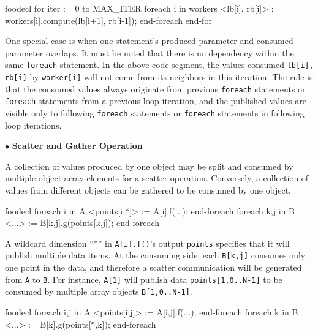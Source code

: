 \documentclass[10pt]{article}
\def\smallfbox#1{{\small {\fbox{#1}}}}
\def\code#1{{\small {\tt {#1}}}}
\begin{document}
\begin{SaveVerbatim}{foodecl}
  for iter := 0 to MAX_ITER
    foreach i in workers
      <lb[i], rb[i]> := workers[i].compute(lb[i+1], rb[i-1]);
    end-foreach
  end-for
\end{SaveVerbatim}
\vspace{0.1in}
\smallfbox{\BUseVerbatim{foodecl}}
\vspace{0.1in}

One special case is when one statement's produced parameter and consumed
parameter overlaps. It must be noted that there is no dependency within the same
\code{foreach} statement. In the above code segment, the values consumed
\code{lb[i], rb[i]} by \code{worker[i]} will not come from  
its neighbors in this iteration. The rule is that the consumed values always
originate from previous \code{foreach} statements or \code{foreach} statements
from a previous loop iteration, and the published values are visible only to
following \code{foreach} statements or \code{foreach} statements in following
loop iterations. 

$\bullet$ {\bf Scatter and Gather Operation}

A collection of values produced by one object may be split and consumed by
multiple object array elements for a scatter operation. Conversely, a collection
of values from different objects can be gathered to be consumed by one object.

\begin{SaveVerbatim}{foodecl}
  foreach i in A
    <points[i,*]> := A[i].f(...);
  end-foreach
  foreach k,j in B
    <...> := B[k,j].g(points[k,j]);
  end-foreach
\end{SaveVerbatim}
\vspace{0.1in}
\smallfbox{\BUseVerbatim{foodecl}}
\vspace{0.1in}

A wildcard dimension ``*'' in \code{A[i].f()}'s output \code{points} specifies
that it will publish multiple data items. At the consuming side, each
\code{B[k,j]} consumes only one point in the data, and therefore a scatter
communication will be generated from \code{A} to \code{B}. For instance,
\code{A[1]} will publish data \code{points[1,0..N-1]} to be consumed by multiple
array objects \code{B[1,0..N-1]}.  

\begin{SaveVerbatim}{foodecl}
  foreach i,j in A
    <points[i,j]> := A[i,j].f(...);
  end-foreach
  foreach k in B
    <...> := B[k].g(points[*,k]);
  end-foreach
\end{SaveVerbatim}
\vspace{0.1in}
\smallfbox{\BUseVerbatim{foodecl}}
\vspace{0.1in}
\end{document}
